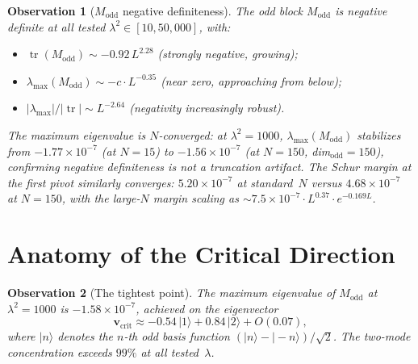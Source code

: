 \documentclass[11pt,a4paper]{article}
\newtheorem{observation}{Observation}[section]
\DeclareMathOperator{\tr}{tr}
\begin{document}
\begin{observation}[$M_{\mathrm{odd}}$ negative definiteness]\label{obs:modd}
The odd block $M_{\mathrm{odd}}$ is negative definite at all tested $\lambda^2 \in [10, 50{,}000]$, with:
\begin{itemize}
\item $\tr(M_{\mathrm{odd}}) \sim -0.92\, L^{2.28}$ (strongly negative, growing);
\item $\lambda_{\max}(M_{\mathrm{odd}}) \sim -c \cdot L^{-0.35}$ (near zero, approaching from below);
\item $|\lambda_{\max}| / |\tr| \sim L^{-2.64}$ (negativity increasingly robust).
\end{itemize}
The maximum eigenvalue is $N$-converged: at $\lambda^2 = 1000$, $\lambda_{\max}(M_{\mathrm{odd}})$ stabilizes from $-1.77 \times 10^{-7}$ (at $N=15$) to $-1.56 \times 10^{-7}$ (at $N=150$, dim$_{\mathrm{odd}} = 150$), confirming negative definiteness is not a truncation artifact. The Schur margin at the first pivot similarly converges: $5.20 \times 10^{-7}$ at standard~$N$ versus $4.68 \times 10^{-7}$ at $N = 150$, with the large-$N$ margin scaling as $\sim 7.5 \times 10^{-7} \cdot L^{0.37} \cdot e^{-0.169 L}$.
\end{observation}

\section{Anatomy of the Critical Direction}\label{sec:anatomy}

\begin{observation}[The tightest point]\label{obs:critical}
The maximum eigenvalue of $M_{\mathrm{odd}}$ at $\lambda^2 = 1000$ is $-1.58 \times 10^{-7}$, achieved on the eigenvector
\begin{equation}\label{eq:vcrit}
\mathbf{v}_{\mathrm{crit}} \approx -0.54\, |1\rangle + 0.84\, |2\rangle + O(0.07),
\end{equation}
where $|n\rangle$ denotes the $n$-th odd basis function $(|n\rangle - |-n\rangle)/\sqrt{2}$. The two-mode concentration exceeds $99\%$ at all tested~$\lambda$.
\end{observation}
\end{document}
